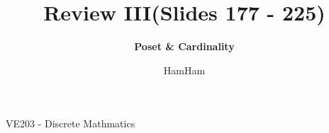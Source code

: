 \documentclass{beamer}
\title{\sffamily Review III(Slides 177 - 225)}
\subtitle{\textbf{Poset \& Cardinality}\\}
\institute[UM-SJTU JI]{University of Michigan-Shanghai Jiao Tong University Joint Institute}
\author{HamHam}
\newcommand{\myfont}{\rmfamily\normalsize\upshape\mdseries}
\begin{document}
\begin{titlepage}
    \begin{center}
        VE203 - Discrete Mathmatics 
    \end{center}
\end{titlepage}
\myfont
\end{document}
